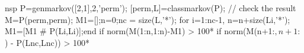 \begin{examples}
  \begin{mintednsp}{nsp}
    P=genmarkov([2,1],2,'perm');
    [perm,L]=classmarkov(P);
    // check the result 
    M=P(perm,perm);
    M1=[];n=0;nc = size(L,'*');
    for i=1:nc-1, n=n+size(L{i},'*'); M1=[M1 # P(L{i},L{i})];end 
    if norm(M(1:n,1:n)-M1) > 100*%
    if norm(M(n+1:$,n+1:$) - P(L{nc},L{nc}))  > 100*%

  \end{mintednsp}
\end{examples}
\begin{manseealso}
     
\end{manseealso}
